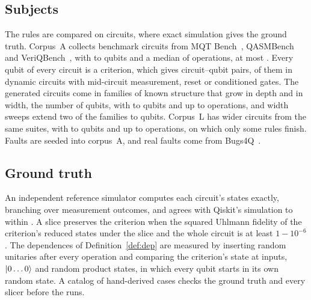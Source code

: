 \subsection{Subjects}
The rules are compared on circuits, where exact simulation gives the ground truth. Corpus~A collects
\numSubjACount{} benchmark circuits from MQT Bench~\cite{quetschlich2023mqt}, QASMBench~\cite{li2023qasmbench} and
VeriQBench~\cite{chen2022veriqbench}, with \numSubjAMinQubits{} to \numSubjAMaxQubits{} qubits and a median of
\numSubjAMedianOps{} operations, at most \numSubjAMaxOps{}. Every qubit of every circuit is a criterion, which gives
\numNPairs{} circuit--qubit pairs, \numNDynamicPairs{} of them in dynamic circuits with mid-circuit measurement, reset
or conditioned gates. The \numSubjGenCount{} generated circuits come in families of known structure that grow in depth
and in width, the number of qubits, with \numSubjGenMinQubits{} to \numSubjGenMaxQubits{} qubits and up to \numSubjGenMaxOps{} operations,
and \numSubjSweepCount{} width sweeps extend two of the families to \numSubjSweepMaxQubits{} qubits. Corpus~L has
\numSubjLCount{} wider circuits from the same suites, with \numSubjLMinQubits{} to \numSubjLMaxQubits{} qubits and up
to \numSubjLMaxOps{} operations, on which only some rules finish. Faults are seeded into corpus~A, and real faults
come from Bugs4Q~\cite{zhao2023bugs4q}.

\subsection{Ground truth}
An independent reference simulator computes each circuit's states exactly, branching over measurement outcomes, and agrees with Qiskit's
simulation to within \numOracleErr{}. A slice preserves the criterion when the squared Uhlmann fidelity of the
criterion's reduced states under the slice and the whole circuit is at least $1 - 10^{-6}$. The
dependences of Definition~\ref{def:dep} are measured by inserting \numInfluencePerturbations{} random unitaries after
every operation and comparing the criterion's state at \numInfluenceInputs{} inputs, $\lvert 0\dots0\rangle$ and random
product states, in which every qubit starts in its own random state. A catalog of \numCatEntries{} hand-derived cases checks the ground truth and every
slicer before the runs.

